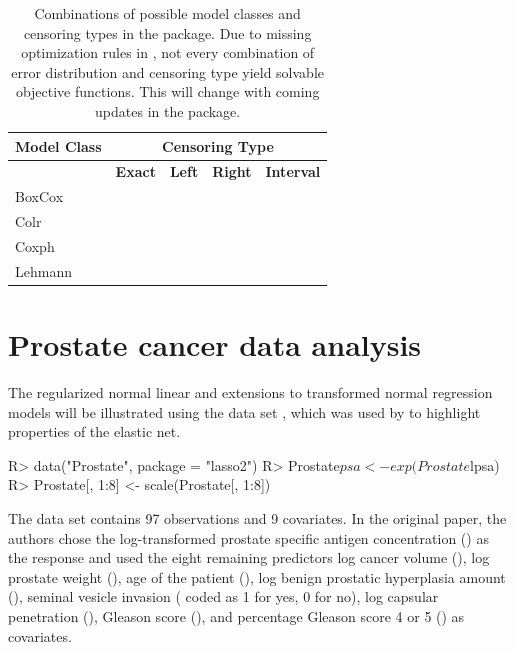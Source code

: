 \begin{table}
  \centering
  \begin{tabular}{@{}lcccc@{}}
  	\toprule
  	\multicolumn{1}{c}{\textbf{Model Class}} &
  	\multicolumn{4}{c}{\textbf{Censoring Type}} \\ \midrule
  	\textbf{} & \multicolumn{1}{l}{\textbf{Exact}} & \multicolumn{1}{l}{\textbf{Left}} &
  	\multicolumn{1}{l}{\textbf{Right}} & \multicolumn{1}{l}{\textbf{Interval}} \\
  	\cmidrule(l){2-5}
  	BoxCox        & \cmark & \xmark & \xmark & \xmark  \\
  	Colr          & \cmark & \cmark & \cmark & \xmark  \\
  	Coxph         & \cmark & \xmark & \cmark & \xmark  \\
  	Lehmann       & \cmark & \cmark & \xmark & \xmark  \\
  	\bottomrule
  \end{tabular}
  \caption{Combinations of possible model classes and censoring types 
  	in the  package. Due to missing optimization
  	rules in , not every combination of error distribution and censoring
  	type yield solvable objective functions. This will change with coming updates
  	in the  package.}
  \label{tab:models}
\end{table}

\section{Prostate cancer data analysis} \label{sec:prostateanalysis}

The regularized normal linear and extensions to transformed normal regression models
will be illustrated using the  data set \citep{stamey1989prostate},
which was used by \citet{zou2005regularization} to highlight properties of the
elastic net.
\begin{example}
R> data("Prostate", package = "lasso2")
R> Prostate$psa <- exp(Prostate$lpsa)
R> Prostate[, 1:8] <- scale(Prostate[, 1:8])
\end{example}
The data set contains 97 observations and 9
covariates. In the original paper, the authors chose the log-transformed prostate
specific antigen concentration () as the response and used the eight
remaining predictors log cancer volume (), log prostate weight
(), age of the patient (), log benign prostatic hyperplasia amount
(), seminal vesicle invasion ( coded as 1 for yes, 0 for no),
log capsular penetration (), Gleason score (), and percentage
Gleason score 4 or 5 () as covariates.

